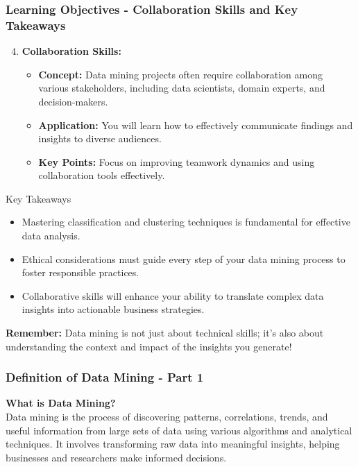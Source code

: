 \documentclass{beamer}
\begin{document}
\begin{frame}[fragile]
    \frametitle{Learning Objectives - Collaboration Skills and Key Takeaways}
    \begin{enumerate}
        \setcounter{enumi}{3}
        \item \textbf{Collaboration Skills:}
        \begin{itemize}
            \item \textbf{Concept:} Data mining projects often require collaboration among various stakeholders, including data scientists, domain experts, and decision-makers.
            \item \textbf{Application:} You will learn how to effectively communicate findings and insights to diverse audiences.
            \item \textbf{Key Points:} Focus on improving teamwork dynamics and using collaboration tools effectively.
        \end{itemize}
    \end{enumerate}
    
    \begin{block}{Key Takeaways}
        \begin{itemize}
            \item Mastering classification and clustering techniques is fundamental for effective data analysis.
            \item Ethical considerations must guide every step of your data mining process to foster responsible practices.
            \item Collaborative skills will enhance your ability to translate complex data insights into actionable business strategies.
        \end{itemize}
    \end{block}
    
    \textbf{Remember:} Data mining is not just about technical skills; it's also about understanding the context and impact of the insights you generate!
\end{frame}

\begin{frame}[fragile]
    \frametitle{Definition of Data Mining - Part 1}
    \textbf{What is Data Mining?}\\
    Data mining is the process of discovering patterns, correlations, trends, and useful information from large sets of data using various algorithms and analytical techniques. It involves transforming raw data into meaningful insights, helping businesses and researchers make informed decisions.
\end{frame}
\end{document}

